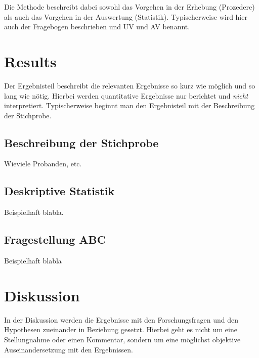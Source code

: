 Die Methode beschreibt dabei sowohl das Vorgehen in der Erhebung (Prozedere) als auch das Vorgehen in der Auswertung (Statistik). 
Typischerweise wird hier auch der Fragebogen beschrieben und UV und AV benannt.









\section{Results}
Der Ergebnisteil beschreibt die relevanten Ergebnisse so kurz wie möglich und so lang wie nötig. Hierbei werden quantitative Ergebnisse nur berichtet und \textit{nicht} interpretiert.
Typischerweise beginnt man den Ergebnisteil mit der Beschreibung der Stichprobe.

\subsection{Beschreibung der Stichprobe}
Wieviele Probanden, etc.

\subsection{Deskriptive Statistik}
Beispielhaft blabla.



\subsection{Fragestellung ABC}
Beispielhaft blabla







\section{Diskussion}
In der Diskussion werden die Ergebnisse mit den Forschungsfragen und den Hypothesen zueinander in Beziehung gesetzt. Hierbei geht es nicht um eine Stellungnahme oder einen Kommentar, sondern um eine möglichst objektive Auseinandersetzung mit den Ergebnissen.

